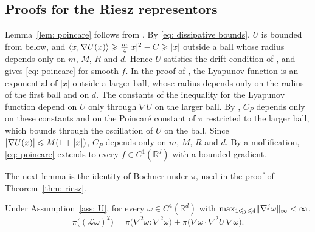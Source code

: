 \subsection{Proofs for the Riesz representors}
\label{sec: riesz well-posedness}

Lemma~\ref{lem: poincare} follows from \citep{bakry2008simple}. By \eqref{eq: dissipative bounds}, $U$ is bounded from below, and $\langle x, \nabla U(x) \rangle \geqslant \frac m4 |x|^2 - C \geqslant |x|$ outside a ball whose radius depends only on $m$, $M$, $R$ and $d$. Hence $U$ satisfies the drift condition of \citep[Corollary~1.6]{bakry2008simple}, and \citep[Theorem~1.4]{bakry2008simple} gives \eqref{eq: poincare} for smooth $f$. In the proof of \citep[Corollary~1.6]{bakry2008simple}, the Lyapunov function is an exponential of $|x|$ outside a larger ball, whose radius depends only on the radius of the first ball and on $d$. The constants of the inequality \citep[(1.3)]{bakry2008simple} for the Lyapunov function depend on $U$ only through $\nabla U$ on the larger ball. By \citep[Theorem~1.4]{bakry2008simple}, $C_P$ depends only on these constants and on the Poincar\'e constant of $\pi$ restricted to the larger ball, which \citep[Section~1]{bakry2008simple} bounds through the oscillation of $U$ on the ball. Since $|\nabla U(x)| \leqslant M(1 + |x|)$, $C_P$ depends only on $m$, $M$, $R$ and $d$. By a mollification, \eqref{eq: poincare} extends to every $f \in C^1(\mathbb R^d)$ with a bounded gradient.

The next lemma is the identity of Bochner under $\pi$, used in the proof of Theorem~\ref{thm: riesz}.

\begin{lemma}
\label{lem: bochner}
    Under Assumption~\ref{ass: U}, for every $\omega \in C^4(\mathbb R^d)$ with $\max_{1 \leqslant j \leqslant 4} \lVert \nabla^j \omega \rVert_\infty < \infty$,
    \begin{equation}
        \pi\bigl( (\mathcal L \omega)^2 \bigr) = \pi\bigl( \nabla^2 \omega : \nabla^2 \omega \bigr) + \pi\bigl( \nabla \omega \cdot \nabla^2 U\, \nabla \omega \bigr) .
        \label{eq: bochner}
    \end{equation}
\end{lemma}


